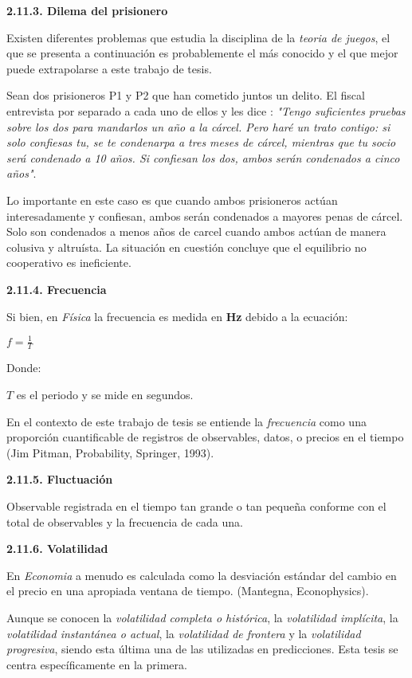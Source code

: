 {
\noindent
\Large  \textbf{2.11.3. Dilema del prisionero} 
}

Existen diferentes problemas que estudia la disciplina de la \textit{teoria de juegos}, el que se presenta a continuación es probablemente el más conocido y el que mejor puede extrapolarse a este trabajo de tesis. 

Sean dos prisioneros P1 y P2  que han cometido juntos un delito. El fiscal entrevista por separado a cada uno de ellos y les dice : \textit{"Tengo suficientes pruebas sobre los dos para mandarlos un año a la cárcel. Pero haré un trato contigo: si solo confiesas tu, se te condenarpa a tres meses de cárcel, mientras que tu socio será condenado a 10 años. Si confiesan los dos, ambos serán condenados a cinco años"}. 

Lo importante en este caso es que cuando ambos prisioneros actúan interesadamente y confiesan, ambos serán condenados a mayores penas de cárcel. Solo son condenados a menos años de carcel cuando ambos actúan de manera colusiva y altruísta. La situación en cuestión concluye que el equilibrio no cooperativo es ineficiente. 
\newpage

{
\noindent
\Large  \textbf{2.11.4. Frecuencia} 
}

Si bien, en \textit{Física} la frecuencia es medida en \textbf{Hz} debido a la ecuación:
\begin{center}
$f=\frac{1}{\textit{T}}$
\end{center}

Donde: 

$\textit{T}  $ es el periodo y se mide en segundos.

En el contexto de este trabajo de tesis se entiende la \textit{frecuencia} como una proporción cuantificable de registros de observables, datos, o precios en el tiempo (Jim Pitman, Probability, Springer, 1993).

{
\noindent
\Large  \textbf{2.11.5. Fluctuación} 
}


Observable registrada en el tiempo tan grande o tan pequeña conforme con el total de observables y la frecuencia de cada una. 

{
\noindent
\Large  \textbf{2.11.6. Volatilidad} 
}

En \textit{Economia} a menudo es calculada como la desviación estándar del cambio en el precio en una apropiada ventana de tiempo. (Mantegna, Econophysics).

Aunque se conocen la \textit{volatilidad completa o histórica}, la \textit{volatilidad implícita}, la  \textit{volatilidad instantánea o actual}, la \textit{volatilidad de frontera} y la \textit{volatilidad progresiva}, siendo esta última una de las utilizadas en predicciones. Esta tesis se centra específicamente en la primera.

